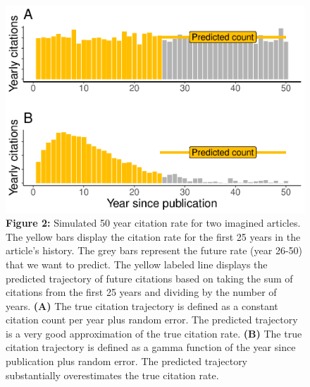 \documentclass[
  english,
  jou,floatsintext]{apa6}
\begin{document}
\begin{figure}
\centering
\includegraphics{RVcn_manuscript_files/figure-latex/2-1.pdf}
\caption{\label{fig:2}\textbf{Figure 2:} Simulated 50 year citation rate for two imagined articles. The yellow bars display the citation rate for the first 25 years in the article's history. The grey bars represent the future rate (year 26-50) that we want to predict. The yellow labeled line displays the predicted trajectory of future citations based on taking the sum of citations from the first 25 years and dividing by the number of years. \textbf{(A)} The true citation trajectory is defined as a constant citation count per year plus random error. The predicted trajectory is a very good approximation of the true citation rate. \textbf{(B)} The true citation trajectory is defined as a gamma function of the year since publication plus random error. The predicted trajectory substantially overestimates the true citation rate.}
\end{figure}
\end{document}
